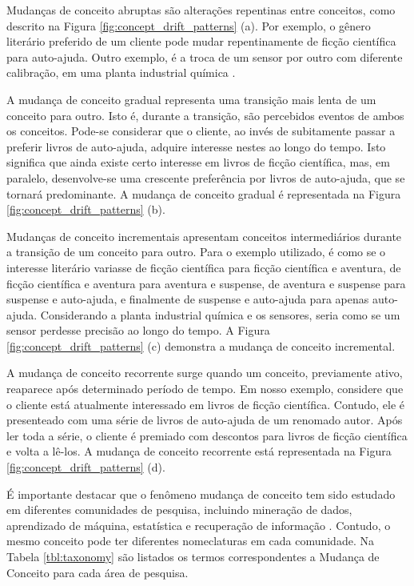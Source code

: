 \documentclass[qual, classic, a4paper]{ufbathesis}
\begin{document}
Mudanças de conceito abruptas são alterações repentinas entre conceitos, como descrito na Figura \ref{fig:concept_drift_patterns} (a).
Por exemplo, o gênero literário preferido de um cliente pode mudar repentinamente de ficção científica para auto-ajuda.
Outro exemplo, é a troca de um sensor por outro com diferente calibração, em uma planta industrial química \cite{Gama:2014:SCD:2597757.2523813}. 

A mudança de conceito gradual representa uma transição mais lenta de um conceito para outro.
Isto é, durante a transição, são percebidos eventos de ambos os conceitos.
Pode-se considerar que o cliente, ao invés de subitamente passar a preferir livros de auto-ajuda, adquire interesse nestes ao longo do tempo.
Isto significa que ainda existe certo interesse em livros de ficção científica, mas, em paralelo, desenvolve-se uma crescente preferência por livros de auto-ajuda, que se tornará predominante.
A mudança de conceito gradual é representada na Figura \ref{fig:concept_drift_patterns} (b).

Mudanças de conceito incrementais apresentam conceitos intermediários durante a transição de um conceito para outro.
Para o exemplo utilizado, é como se o interesse literário variasse de ficção científica para ficção científica e aventura, 
de ficção científica e aventura para aventura e suspense, de aventura e suspense para suspense e auto-ajuda, e finalmente de suspense e auto-ajuda para apenas auto-ajuda.
Considerando a planta industrial química e os sensores, seria como se um sensor perdesse precisão ao longo do tempo. 
A Figura \ref{fig:concept_drift_patterns} (c) demonstra a mudança de conceito incremental. 

A mudança de conceito recorrente surge quando um conceito, previamente ativo, reaparece após determinado período de tempo.
Em nosso exemplo, considere que o cliente está atualmente interessado em livros de ficção científica.
Contudo, ele é presenteado com uma série de livros de auto-ajuda de um renomado autor.
Após ler toda a série, o cliente é premiado com descontos para livros de ficção científica e volta a lê-los.
A mudança de conceito recorrente está representada na Figura \ref{fig:concept_drift_patterns} (d).

É importante destacar que o fenômeno mudança de conceito tem sido estudado em diferentes comunidades de pesquisa, incluindo mineração de dados, 
aprendizado de máquina, estatística e recuperação de informação \cite{Zliobaite:2010}.
Contudo, o mesmo conceito pode ter diferentes nomeclaturas em cada comunidade.
Na Tabela \ref{tbl:taxonomy} são listados os termos correspondentes a Mudança de Conceito para cada área de pesquisa.
\end{document}
